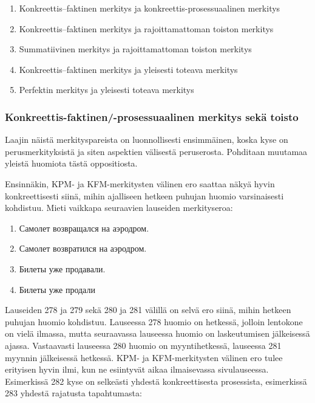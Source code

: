 \documentclass[]{scrartcl}
\providecommand{\tightlist}{%
  \setlength{\itemsep}{0pt}\setlength{\parskip}{0pt}}
\begin{document}
\begin{enumerate}
\def\labelenumi{\arabic{enumi}.}
\tightlist
\item
  Konkreettis--faktinen merkitys ja konkreettis-prosessuaalinen merkitys
\item
  Konkreettis--faktinen merkitys ja rajoittamattoman toiston merkitys
\item
  Summatiivinen merkitys ja rajoittamattoman toiston merkitys
\item
  Konkreettis--faktinen merkitys ja yleisesti toteava merkitys
\item
  Perfektin merkitys ja yleisesti toteava merkitys
\end{enumerate}

\subsubsection{Konkreettis-faktinen/-prosessuaalinen merkitys sekä
toisto}\label{konkreettis-faktinen-prosessuaalinen-merkitys-sekuxe4-toisto}

Laajin näistä merkityspareista on luonnollisesti ensimmäinen, koska kyse
on perusmerkityksistä ja siten aspektien välisestä peruserosta.
Pohditaan muutamaa yleistä huomiota tästä oppositiosta.

Ensinnäkin, KPM- ja KFM-merkitysten välinen ero saattaa näkyä hyvin
konkreettisesti siinä, mihin ajalliseen hetkeen puhujan huomio
varsinaisesti kohdistuu. Mieti vaikkapa seuraavien lauseiden
merkityseroa:

\begin{enumerate}
\def\labelenumi{(\arabic{enumi})}
\setcounter{enumi}{277}
\tightlist
\item
  Самолет возвращался на аэродром.
\item
  Самолет возвратился на аэродром.
\item
  Билеты уже продавали.
\item
  Билеты уже продали
\end{enumerate}

Lauseiden 278 ja 279 sekä 280 ja 281 välillä on selvä ero siinä, mihin
hetkeen puhujan huomio kohdistuu. Lauseessa 278 huomio on hetkessä,
jolloin lentokone on vielä ilmassa, mutta seuraavassa lauseessa huomio
on laskeutumisen jälkeisessä ajassa. Vastaavasti lauseessa 280 huomio on
myyntihetkessä, lauseessa 281 myynnin jälkeisessä hetkessä. KPM- ja
KFM-merkitysten välinen ero tulee erityisen hyvin ilmi, kun ne
esiintyvät aikaa ilmaisevassa sivulauseessa. Esimerkissä 282 kyse on
selkeästi yhdestä konkreettisesta prosessista, esimerkissä 283 yhdestä
rajatusta tapahtumasta:
\end{document}
